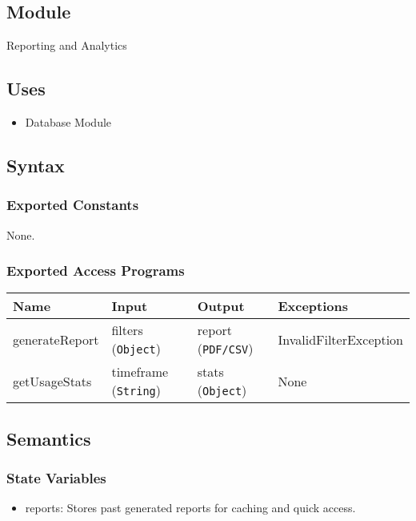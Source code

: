 \documentclass[12pt, titlepage]{article}
\begin{document}
\subsection{Module}
Reporting and Analytics

\subsection{Uses}
\begin{itemize}
    \item Database Module
\end{itemize}

\subsection{Syntax}
\subsubsection{Exported Constants}
None.

\subsubsection{Exported Access Programs}
\begin{center}
    \scriptsize
    \begin{tabular}{p{2cm} p{4cm} p{4cm} p{2cm}}
        \hline
        \textbf{Name} & \textbf{Input} & \textbf{Output} & \textbf{Exceptions} \\
        \hline
        generateReport & filters (\texttt{Object}) & report (\texttt{PDF/CSV}) & InvalidFilterException \\
        getUsageStats & timeframe (\texttt{String}) & stats (\texttt{Object}) & None \\
        \hline
    \end{tabular}
\end{center}

\subsection{Semantics}
\subsubsection{State Variables}
\begin{itemize}
    \item reports: Stores past generated reports for caching and quick access.
\end{itemize}
\end{document}
